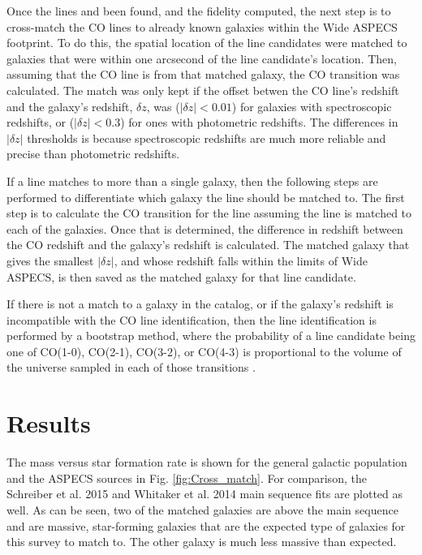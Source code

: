 Once the lines and been found, and the fidelity computed, the next step is to cross-match the CO lines to already known galaxies within the Wide ASPECS footprint. To do this, the spatial location of the line candidates were matched to galaxies that were within one arcsecond of the line candidate's location. Then, assuming that the CO line is from that matched galaxy, the CO transition was calculated. The match was only kept if the offset betwen the CO line's redshift and the galaxy's redshift, $\delta z$, was ($|\delta z| < 0.01$) for galaxies with spectroscopic redshifts, or ($|\delta z| < 0.3$) for ones with photometric redshifts. The differences in $|\delta z|$ thresholds is because spectroscopic redshifts are much more reliable and precise than photometric redshifts. 

If a line matches to more than a single galaxy, then the following steps are performed to differentiate which galaxy the line should be matched to. The first step is to calculate the CO transition for the line assuming the line is matched to each of the galaxies. Once that is determined, the difference in redshift between the CO redshift and the galaxy's redshift is calculated. The matched galaxy that gives the smallest $|\delta z|$, and whose redshift falls within the limits of Wide ASPECS, is then saved as the matched galaxy for that line candidate. 

If there is not a match to a galaxy in the catalog, or if the galaxy's redshift is incompatible with the CO line identification, then the line identification is performed by a bootstrap method, where the probability of a line candidate being one of CO(1-0), CO(2-1), CO(3-2), or CO(4-3) is proportional to the volume of the universe sampled in each of those transitions \cite{walter2016alma, decarli2019alma}.

\section{Results}

The mass versus star formation rate is shown for the general galactic population and the ASPECS sources in Fig. \ref{fig:Cross_match}. For comparison, the Schreiber et al. 2015 \cite{schreiber2015herschel} and Whitaker et al. 2014 \cite{Whitaker_2014} main sequence fits are plotted as well. As can be seen, two of the matched galaxies are above the main sequence and are massive, star-forming galaxies that are the expected type of galaxies for this survey to match to. The other galaxy is much less massive than expected. 

